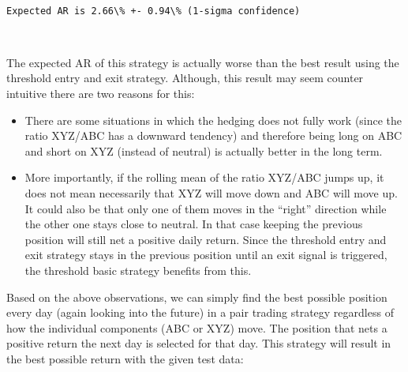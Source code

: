 \documentclass[11pt]{article}
\begin{document}
    \begin{center}
    \end{center}
    { \hspace*{\fill} \\}
    
    \begin{Verbatim}[commandchars=\\\{\}]
Expected AR is 2.66\% +- 0.94\% (1-sigma confidence)

    \end{Verbatim}

    \begin{center}
    \end{center}
    { \hspace*{\fill} \\}
    
    The expected AR of this strategy is actually worse than the best result
using the threshold entry and exit strategy. Although, this result may
seem counter intuitive there are two reasons for this:

\begin{itemize}
\item
  There are some situations in which the hedging does not fully work
  (since the ratio XYZ/ABC has a downward tendency) and therefore being
  long on ABC and short on XYZ (instead of neutral) is actually better
  in the long term.
\item
  More importantly, if the rolling mean of the ratio XYZ/ABC jumps up,
  it does not mean necessarily that XYZ will move down and ABC will move
  up. It could also be that only one of them moves in the ``right''
  direction while the other one stays close to neutral. In that case
  keeping the previous position will still net a positive daily return.
  Since the threshold entry and exit strategy stays in the previous
  position until an exit signal is triggered, the threshold basic
  strategy benefits from this.
\end{itemize}

Based on the above observations, we can simply find the best possible
position every day (again looking into the future) in a pair trading
strategy regardless of how the individual components (ABC or XYZ) move.
The position that nets a positive return the next day is selected for
that day. This strategy will result in the best possible return with the
given test data:
\end{document}
